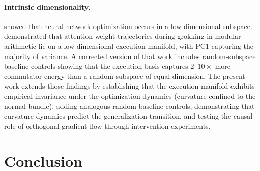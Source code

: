 \documentclass[11pt]{article}
\begin{document}
\paragraph{Intrinsic dimensionality.}
\citet{li2018measuring} showed that neural network optimization occurs in a low-dimensional subspace.
\citet{xu2026lowdim} demonstrated that attention weight trajectories during grokking in modular arithmetic lie on a low-dimensional execution manifold, with PC1 capturing the majority of variance.
A corrected version of that work includes random-subspace baseline controls showing that the execution basis captures $2$--$10\times$ more commutator energy than a random subspace of equal dimension.
The present work extends those findings by establishing that the execution manifold exhibits empirical invariance under the optimization dynamics (curvature confined to the normal bundle), adding analogous random baseline controls, demonstrating that curvature dynamics predict the generalization transition, and testing the causal role of orthogonal gradient flow through intervention experiments.


\section{Conclusion}
\label{sec:conclusion}
\end{document}
